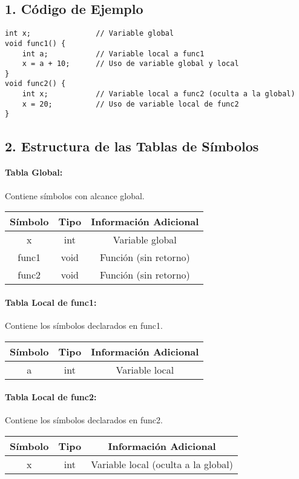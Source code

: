 \subsection*{1. Código de Ejemplo}
\begin{verbatim}
int x;               // Variable global
void func1() {
    int a;           // Variable local a func1
    x = a + 10;      // Uso de variable global y local
}
void func2() {
    int x;           // Variable local a func2 (oculta a la global)
    x = 20;          // Uso de variable local de func2
}
\end{verbatim}

\subsection*{2. Estructura de las Tablas de Símbolos}

\paragraph{Tabla Global:} Contiene símbolos con alcance global.

\vspace{1mm}

\begin{tabular}{|c|c|c|}
\hline
\textbf{Símbolo} & \textbf{Tipo} & \textbf{Información Adicional} \\
\hline
x       & int  & Variable global                \\
func1   & void & Función (sin retorno)          \\
func2   & void & Función (sin retorno)          \\
\hline
\end{tabular}

\paragraph{Tabla Local de func1:} Contiene los símbolos declarados en func1.

\vspace{1mm}

\begin{tabular}{|c|c|c|}
\hline
\textbf{Símbolo} & \textbf{Tipo} & \textbf{Información Adicional} \\
\hline
a       & int  & Variable local                 \\
\hline
\end{tabular}

\paragraph{Tabla Local de func2:} Contiene los símbolos declarados en func2.

\vspace{1mm}

\begin{tabular}{|c|c|c|}
\hline
\textbf{Símbolo} & \textbf{Tipo} & \textbf{Información Adicional} \\
\hline
x       & int  & Variable local (oculta a la global) \\
\hline
\end{tabular}
